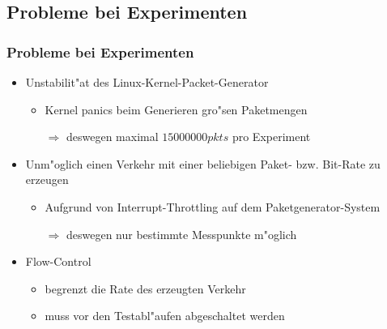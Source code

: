 \documentclass{beamer}
\begin{document}
\subsection*{Probleme bei Experimenten}
\begin{frame}
\frametitle{Probleme bei Experimenten}
\begin{itemize}
	\item Unstabilit"at des Linux-Kernel-Packet-Generator
		\begin{itemize}
			\item Kernel panics beim Generieren gro"sen Paketmengen 
			\item [$\Rightarrow$] deswegen maximal $15000000 pkts$ pro Experiment\newline
		\end{itemize}
	\item Unm"oglich einen Verkehr mit einer beliebigen Paket- bzw. Bit-Rate zu erzeugen
		\begin{itemize}
			\item Aufgrund von Interrupt-Throttling auf dem Paketgenerator-System
			\item [$\Rightarrow$] deswegen nur bestimmte Messpunkte m"oglich\newline
		\end{itemize}
	\item Flow-Control
		\begin{itemize}
			\item begrenzt die Rate des erzeugten Verkehr
			\item muss vor den Testabl"aufen abgeschaltet werden
		\end{itemize}
\end{itemize}
\end{frame}
\end{document}
